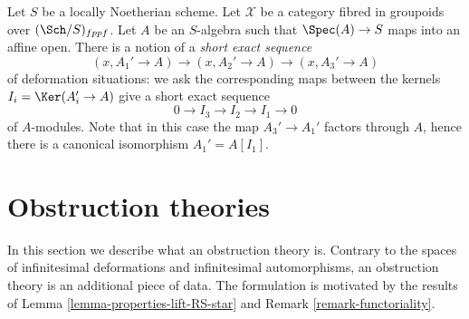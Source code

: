\begin{remark}
\label{remark-short-exact-sequence-thickenings}
Let $S$ be a locally Noetherian scheme. Let $\mathcal{X}$ be a category
fibred in groupoids over $(\Sch/S)_{fppf}$. Let $A$ be an $S$-algebra
such that $\Spec(A) \to S$ maps into an affine open. There
is a notion of a {\it short exact sequence}
$$
(x, A_1' \to A) \to (x, A_2' \to A) \to (x, A_3' \to A)
$$
of deformation situations: we ask the corresponding maps between
the kernels $I_i = \Ker(A_i' \to A)$ give a short exact sequence
$$
0 \to I_3 \to I_2 \to I_1 \to 0
$$
of $A$-modules. Note that in this case the map $A_3' \to A_1'$
factors through $A$, hence there is a canonical isomorphism
$A_1' = A[I_1]$.
\end{remark}





\section{Obstruction theories}
\label{section-obstruction-theory}

\noindent
In this section we describe what an obstruction theory is.
Contrary to the spaces of infinitesimal deformations and infinitesimal
automorphisms, an obstruction theory is an additional piece of data.
The formulation is motivated by the results of
Lemma \ref{lemma-properties-lift-RS-star}
and Remark \ref{remark-functoriality}.

